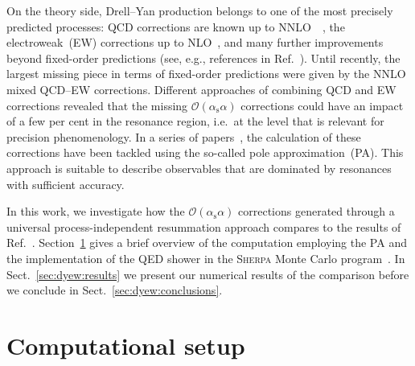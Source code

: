 \documentclass[11pt]{cernrep}
\newcommand{\order}{\ensuremath{\mathcal{O}}}
\newcommand{\alphas}{\ensuremath{\alpha_\mathrm{s}}}
\begin{document}
On the theory side, Drell--Yan production belongs to one of the most precisely predicted processes:
QCD corrections are known up to NNLO~~\cite{Hamberg:1990np,Harlander:2002wh,Anastasiou:2003ds,Melnikov:2006di,Melnikov:2006kv,Catani:2009sm,Gavin:2010az,Gavin:2012sy}, the electroweak~(EW) corrections up to NLO~\cite{Baur:1997wa,Zykunov:2001mn,Baur:2001ze,Dittmaier:2001ay,Baur:2004ig,Arbuzov:2005dd,CarloniCalame:2006zq,Zykunov:2005tc,CarloniCalame:2007cd,Arbuzov:2007db,Brensing:2007qm,Dittmaier:2009cr}, and many further improvements beyond fixed-order predictions (see, e.g., references in Ref.~\cite{Dittmaier:2015rxo}).
Until recently, the largest missing piece in terms of fixed-order predictions were given by the NNLO mixed QCD--EW corrections.
Different approaches of combining QCD and EW corrections revealed that the missing $\order(\alphas\alpha)$ corrections could have an impact of a few per cent in the resonance region, i.e.\ at the level that is relevant for precision phenomenology.
In a series of papers~\cite{Dittmaier:2014qza,Dittmaier:2015rxo}, the calculation of these corrections have been tackled using the so-called pole approximation~(PA).
This approach is suitable to describe observables that are dominated by resonances with sufficient accuracy.

In this work, we investigate how the $\order(\alphas\alpha)$ corrections 
generated through a universal process-independent resummation approach 
compares to the results of Ref.~\cite{Dittmaier:2015rxo}.
Section~\ref{sec:dyew:comp} gives a brief overview of the computation 
employing the PA and the implementation of the QED shower in the 
\textsc{Sherpa} Monte Carlo program~\cite{Gleisberg:2008ta}.
In Sect.~\ref{sec:dyew:results} we present our numerical results of the 
comparison before we conclude in Sect.~\ref{sec:dyew:conclusions}.


\section{Computational setup}
\label{sec:dyew:comp}

\end{document}
